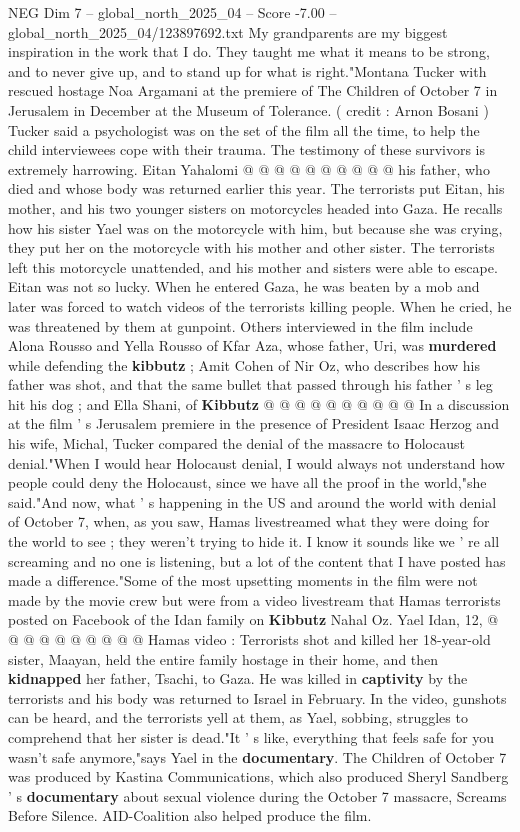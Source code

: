 \begin{textsample}{NEG Dim 7 – global\_north\_2025\_04 – Score -7.00 – global\_north\_2025\_04/123897692.txt}
My grandparents are my biggest inspiration in the work that I do.
They taught me what it means to be strong, and to never give up, and to stand up for what is right."Montana Tucker with rescued hostage Noa Argamani at the premiere of The Children of October 7 in Jerusalem in December at the Museum of Tolerance. ( credit : Arnon Bosani ) Tucker said a psychologist was on the set of the film all the time, to help the child interviewees cope with their trauma.
The testimony of these survivors is extremely harrowing.
Eitan Yahalomi @ @ @ @ @ @ @ @ @ @ his father, who died and whose body was returned earlier this year.
The terrorists put Eitan, his mother, and his two younger sisters on motorcycles headed into Gaza.
He recalls how his sister Yael was on the motorcycle with him, but because she was crying, they put her on the motorcycle with his mother and other sister.
The terrorists left this motorcycle unattended, and his mother and sisters were able to escape.
Eitan was not so lucky.
When he entered Gaza, he was beaten by a mob and later was forced to watch videos of the terrorists killing people.
When he cried, he was threatened by them at gunpoint.
Others interviewed in the film include Alona Rousso and Yella Rousso of Kfar Aza, whose father, Uri, was \textbf{murdered} while defending the \textbf{kibbutz} ; Amit Cohen of Nir Oz, who describes how his father was shot, and that the same bullet that passed through his father ' s leg hit his dog ; and Ella Shani, of \textbf{Kibbutz} @ @ @ @ @ @ @ @ @ @ In a discussion at the film ' s Jerusalem premiere in the presence of President Isaac Herzog and his wife, Michal, Tucker compared the denial of the massacre to Holocaust denial."When I would hear Holocaust denial, I would always not understand how people could deny the Holocaust, since we have all the proof in the world,"she said."And now, what ' s happening in the US and around the world with denial of October 7, when, as you saw, Hamas livestreamed what they were doing for the world to see ; they weren't trying to hide it.
I know it sounds like we ' re all screaming and no one is listening, but a lot of the content that I have posted has made a difference."Some of the most upsetting moments in the film were not made by the movie crew but were from a video livestream that Hamas terrorists posted on Facebook of the Idan family on \textbf{Kibbutz} Nahal Oz.
Yael Idan, 12, @ @ @ @ @ @ @ @ @ @ Hamas video : Terrorists shot and killed her 18-year-old sister, Maayan, held the entire family hostage in their home, and then \textbf{kidnapped} her father, Tsachi, to Gaza.
He was killed in \textbf{captivity} by the terrorists and his body was returned to Israel in February.
In the video, gunshots can be heard, and the terrorists yell at them, as Yael, sobbing, struggles to comprehend that her sister is dead."It ' s like, everything that feels safe for you wasn't safe anymore,"says Yael in the \textbf{documentary}.
The Children of October 7 was produced by Kastina Communications, which also produced Sheryl Sandberg ' s \textbf{documentary} about sexual violence during the October 7 massacre, Screams Before Silence.
AID-Coalition also helped produce the film.


\end{textsample}
